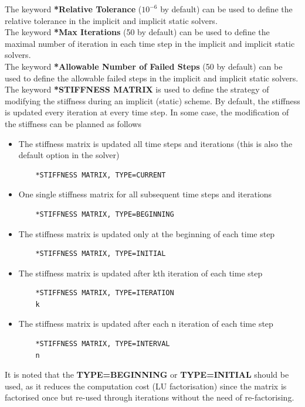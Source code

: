 \documentclass[oneside,11pt,times]{book}
\begin{document}
The keyword \textbf{*Relative Tolerance} ($10^{-6}$ by default) can be used to define the relative tolerance in the implicit and implicit static solvers.\\

The keyword \textbf{*Max Iterations} (50 by default) can be used to define the maximal number of iteration in each time step in the implicit and implicit static solvers.\\

The keyword \textbf{*Allowable Number of Failed Steps} (50 by default) can be used to define the allowable failed steps in the implicit and implicit static solvers.\\


The keyword \textbf{*STIFFNESS MATRIX} is used to define the strategy of modifying the stiffness during an implicit (static) scheme. By default, the stiffness is updated every iteration at every time step. In some case, the modification of the stiffness can be planned as follows
\begin{itemize}
	\item The stiffness matrix is updated all time steps and iterations (this is also the default option in the solver)
	\begin{lstlisting}
	*STIFFNESS MATRIX, TYPE=CURRENT
	\end{lstlisting}
	\item One single stiffness matrix for all subsequent time steps and iterations
	\begin{lstlisting}
	*STIFFNESS MATRIX, TYPE=BEGINNING
	\end{lstlisting}
	\item The stiffness matrix is updated only at the beginning of each time step
	\begin{lstlisting}
	*STIFFNESS MATRIX, TYPE=INITIAL
	\end{lstlisting}
	\item The stiffness matrix is updated after kth iteration of each time step
	\begin{lstlisting}
	*STIFFNESS MATRIX, TYPE=ITERATION
	k
	\end{lstlisting}
	\item The stiffness matrix is updated after each n iteration of each time step
	\begin{lstlisting}
	*STIFFNESS MATRIX, TYPE=INTERVAL
	n
	\end{lstlisting}
\end{itemize}
It is noted that the \textbf{TYPE=BEGINNING} or \textbf{TYPE=INITIAL} should be used, as it reduces the computation cost (LU factorisation) since the matrix is factorised once but re-used through iterations without the need of re-factorising.
\end{document}
